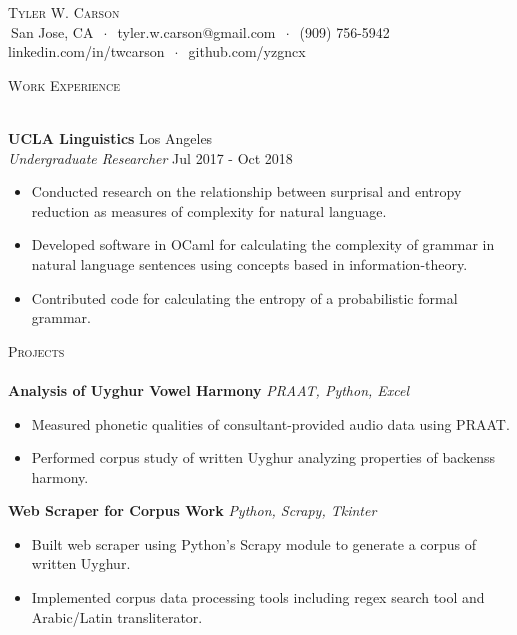 \documentclass[]{article}
\newcommand{\lineunder} {
    \vspace*{-8pt} \\
    \hspace*{-18pt} \hrulefill \\
}
\newcommand{\header} [1] {
    {\hspace*{-18pt}\vspace*{6pt} \textsc{#1}}
    \vspace*{-6pt} \lineunder
}
\begin{document}
\vspace*{-40pt}


\vspace*{-10pt}
\begin{center}
	{\Huge \scshape {Tyler W. Carson}}\\
	$\ $San Jose, CA $\ \cdot\ $ tyler.w.carson@gmail.com $\ \cdot\ $ (909) 756-5942\\ linkedin.com/in/twcarson $\ \cdot\ $ github.com/yzgncx\\
\end{center}


\header{Work Experience}
\vspace{1mm}

\textbf{UCLA Linguistics} \hfill Los Angeles\\
\textit{Undergraduate Researcher} \hfill Jul 2017 - Oct 2018\\
\vspace{-3mm}
\begin{itemize} \itemsep 0pt
	\item Conducted research on the relationship between surprisal and entropy reduction as measures of complexity for natural language.
	\item Developed software in OCaml for calculating the complexity of grammar in natural language sentences using concepts based in information-theory.
	\item Contributed code for calculating the entropy of a probabilistic formal grammar.
\end{itemize}

\header{Projects}
{\textbf{Analysis of Uyghur Vowel Harmony}} \hspace*{5mm} {\sl PRAAT, Python, Excel}
\vspace*{-5pt}\begin{itemize}	\itemsep 0pt 
	\item Measured phonetic qualities of consultant-provided audio data using PRAAT.
	\item Performed corpus study of written Uyghur analyzing properties of backenss harmony.
\end{itemize}
\vspace*{0mm}

{\textbf{Web Scraper for Corpus Work}} \hspace*{5mm} {\sl Python, Scrapy, Tkinter}
\vspace*{-5pt}\begin{itemize}	\itemsep 0pt 
	\item Built web scraper using Python's Scrapy module to generate a corpus of written Uyghur.
	\item Implemented corpus data processing tools including regex search tool and Arabic/Latin transliterator.
\end{itemize}
\vspace*{0mm}
\end{document}
